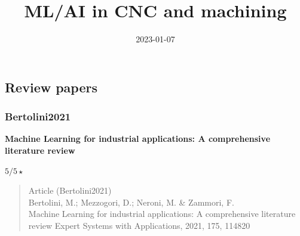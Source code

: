 \documentclass[
  letterpaper,
  DIV=11,
  numbers=noendperiod]{scrartcl}
\title{ML/AI in CNC and machining}
\author{}
\date{2023-01-07}
\renewcommand*\contentsname{Table of contents}
\newcommand\contentsname{Table of contents}
\begin{document}
\maketitle
\ifdefined\Shaded\renewenvironment{Shaded}{\begin{tcolorbox}[enhanced, sharp corners, interior hidden, borderline west={3pt}{0pt}{shadecolor}, breakable, frame hidden, boxrule=0pt]}{\end{tcolorbox}}\fi

\renewcommand*\contentsname{Table of contents}
{
\hypersetup{linkcolor=}
\setcounter{tocdepth}{3}
\tableofcontents
}
\hypertarget{review-papers}{%
\subsection{Review papers}\label{review-papers}}

\hypertarget{bertolini2021}{%
\subsubsection{Bertolini2021}\label{bertolini2021}}

\textbf{Machine Learning for industrial applications: A comprehensive
literature review}

\(5/5 \star\)

\begin{quote}
Article (Bertolini2021)\\
Bertolini, M.; Mezzogori, D.; Neroni, M. \& Zammori, F.\\
Machine Learning for industrial applications: A comprehensive literature
review Expert Systems with Applications, 2021, 175, 114820
\end{quote}
\end{document}
